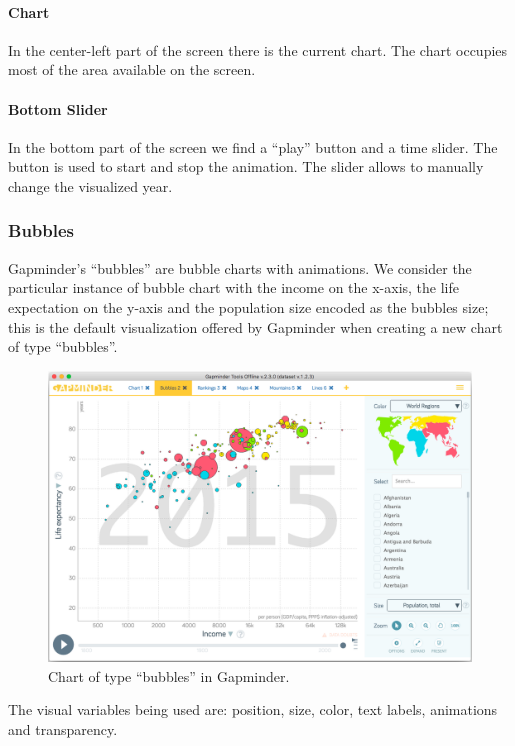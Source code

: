 \paragraph{Chart}
In the center-left part of the screen there is the current chart.
The chart occupies most of the area available on the screen.

\paragraph{Bottom Slider}
In the bottom part of the screen we find a ``play'' button and a time slider.
The button is used to start and stop the animation.
The slider allows to manually change the visualized year.


\subsubsection{Bubbles}
\label{subsubsec:bubbles}
Gapminder's ``bubbles'' are bubble charts with animations.
We consider the particular instance of bubble chart with the income on the x-axis, the life expectation on the y-axis and the population size encoded as the bubbles size; this is the default visualization offered by Gapminder when creating a new chart of type ``bubbles''.

\begin{figure}[h]
	\centering
	\includegraphics[width=0.95\columnwidth]{figures/bubbles}
	\caption{Chart of type ``bubbles'' in Gapminder.}
	\label{fig:bubbles}
\end{figure}

The visual variables being used are: position, size, color, text labels, animations and transparency.

